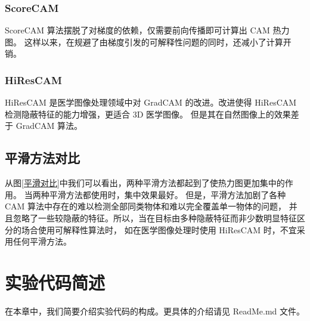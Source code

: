\documentclass[supercite]{Experimental_Report}
\theoremstyle{definition}
\begin{document}
\subsubsection{ScoreCAM}
ScoreCAM 算法摆脱了对梯度的依赖，仅需要前向传播即可计算出 CAM 热力图。
这样以来，在规避了由梯度引发的可解释性问题的同时，还减小了计算开销。

\subsubsection{HiResCAM}
HiResCAM 是医学图像处理领域中对 GradCAM 的改进。改进使得 HiResCAM 检测隐蔽特征的能力增强，更适合 3D 医学图像。
但是其在自然图像上的效果差于 GradCAM 算法。

\subsection{平滑方法对比}
从图\ref{平滑对比}中我们可以看出，两种平滑方法都起到了使热力图更加集中的作用。
当两种平滑方法都使用时，集中效果最好。
但是，平滑方法加剧了各种 CAM 算法中存在的难以检测全部同类物体和难以完全覆盖单一物体的问题，
并且忽略了一些较隐蔽的特征。所以，当在目标由多种隐蔽特征而非少数明显特征区分的场合使用可解释性算法时，
如在医学图像处理时使用 HiResCAM 时，不宜采用任何平滑方法。

\section{实验代码简述}
在本章中，我们简要介绍实验代码的构成。更具体的介绍请见 ReadMe.md 文件。
\end{document}
